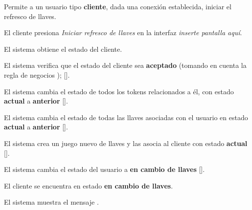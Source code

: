 %
%

{
  Permite a un usuario tipo \textbf{cliente}, dada una conexión establecida,
  iniciar el refresco de llaves.

  \begin{trayectoriaPrincipal}

    \item El cliente presiona \textit{Iniciar refresco de llaves} en la interfaz
      \textit{inserte pantalla aquí}.

    \item El sistema obtiene el estado del cliente.

    \item El sistema verifica que el estado del cliente sea
      \textbf{aceptado} (tomando en cuenta la regla de negocios
      );
      [].

    \item El sistema cambia el estado de todos los tokens relacionados a él, con
      estado \textbf{actual} a \textbf{anterior}
      [].

    \item El sistema cambia el estado de todas las llaves asociadas con el
      usuario en estado \textbf{actual} a \textbf{anterior}
      [].

    \item El sistema crea un juego nuevo de llaves y las asocia al cliente
      con estado \textbf{actual} [].

    \item El sistema cambia el estado del usuario a
      \textbf{en cambio de llaves}
      [].

  \end{trayectoriaPrincipal}

  \begin{trayectoriaAlternativa}
    {El cliente se encuentra en estado \textbf{en cambio de llaves}.}

    \item El sistema muestra el mensaje
      .


\end{trayectoriaAlternativa}}
